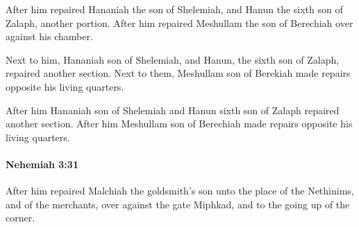 			\begin{versebox}
					\item[BHS] 
					\item[LXX] 
					\item[ASV] After him repaired Hananiah the son of Shelemiah, and Hanun the sixth son of Zalaph, another portion. After him repaired Meshullam the son of Berechiah over against his chamber.
					\item[NIV] Next to him, Hananiah son of Shelemiah, and Hanun, the sixth son of Zalaph, repaired another section. Next to them, Meshullam son of Berekiah made repairs opposite his living quarters.
					\item[NRSV] After him Hananiah son of Shelemiah and Hanun sixth son of Zalaph repaired another section. After him Meshullam son of Berechiah made repairs opposite his living quarters.
			\end{versebox}

		\paragraph{Nehemiah 3:31} %
			\label{NEHEMIAH-3-31}

			After him repaired Malchiah the goldsmith’s son unto the place of the Nethinims, and of the merchants, over against the gate Miphkad, and to the going up of the corner.

